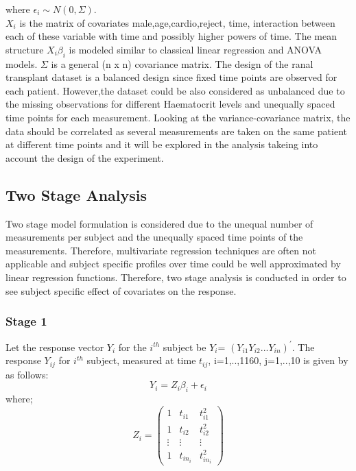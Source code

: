 \documentclass[11pt]{article}
\begin{document}
where $\epsilon_{i} \sim N(0,\Sigma)$. \\

\noindent $X_{i}$ is the matrix of covariates male,age,cardio,reject, time, interaction between each of these variable with time and possibly higher powers of time. The mean structure $X_{i}\beta_{i}$ is modeled similar to classical linear regression and ANOVA models. $\Sigma$ is a general (n x n) covariance matrix. The design of the ranal transplant dataset is a balanced design since fixed time points are observed for each patient. However,the dataset could be also considered as unbalanced due to the missing observations for different Haematocrit levels and unequally spaced time points for each measurement. Looking at the variance-covariance matrix, the data should be correlated as several measurements are taken on the same patient at different time points
and it will be explored in the analysis takeing into account the design of the experiment.


\subsection{Two Stage Analysis}
Two stage model formulation is considered due to the unequal number of measurements per subject and the unequally spaced time points of the measurements. Therefore, multivariate regression techniques are often not applicable and subject specific profiles over time could be well approximated by linear regression functions. Therefore,   two stage analysis is conducted in order to see subject specific effect of covariates on the response\cite{bib8}.

\subsubsection*{Stage 1}

\noindent Let the response vector $Y_{i}$ for the $i^{th}$ subject be $Y_i$= $(Y_{i1} Y_{i2} ... Y_{in} )^{'}$. The response $Y_{ij}$ for $i^{th}$ subject, measured at time $t_{ij}$, i=1,..,1160, j=1,..,10 is given by as follows:
\begin{equation}\label{model2}
Y_{i}=Z_{i}\beta_{i} + \epsilon_{i}
\end{equation}
where;
\[ Z_{i} = \begin{pmatrix} 1 & t_{i1} & t_{i1}^2 \\  1 & t_{i2} & t_{i2}^2 \\ \vdots & \vdots  & \vdots \\ 1 & t_{in_{i}} & t_{in_{i}}^2  \end{pmatrix} \]
\end{document}
